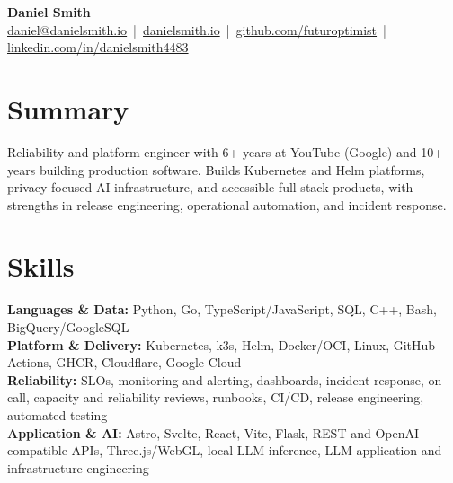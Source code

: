 \documentclass[10pt]{article}
\begin{document}
\begin{center}
    {\LARGE \textbf{Daniel Smith}}\\[-1mm]
    \href{mailto:daniel@danielsmith.io}{daniel@danielsmith.io} \,|\,
    \href{https://danielsmith.io}{danielsmith.io} \,|\,
    \href{https://github.com/futuroptimist}{github.com/futuroptimist} \,|\,
    \href{https://linkedin.com/in/danielsmith4483}{linkedin.com/in/danielsmith4483}
\end{center}

\vspace{-2.5mm}
\section*{Summary}
Reliability and platform engineer with 6+ years at YouTube (Google) and 10+ years building
production software. Builds Kubernetes and Helm platforms, privacy-focused AI infrastructure, and
accessible full-stack products, with strengths in release engineering, operational automation, and
incident response.

\vspace{-2mm}
\section*{Skills}
\textbf{Languages \& Data:} Python, Go, TypeScript/JavaScript, SQL, C++, Bash,
BigQuery/GoogleSQL \\
\textbf{Platform \& Delivery:} Kubernetes, k3s, Helm, Docker/OCI, Linux, GitHub Actions, GHCR,
Cloudflare, Google Cloud \\
\textbf{Reliability:} SLOs, monitoring and alerting, dashboards, incident response, on-call,
capacity and reliability reviews, runbooks, CI/CD, release engineering, automated testing \\
\textbf{Application \& AI:} Astro, Svelte, React, Vite, Flask, REST and OpenAI-compatible APIs,
Three.js/WebGL, local LLM inference, LLM application and infrastructure engineering

\vspace{-2mm}
\end{document}
